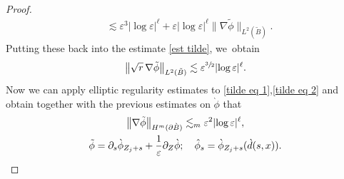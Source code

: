 \documentclass[JEP,XML,SOM,Unicode,published]{cedram}
\let\epsilon\varepsilon
\theoremstyle{definition}
\newcommand\bnorm[1]{\bigl\lVert #1\bigr\rVert}
\newcommand\eq{=}
\let\de\partial
\let\eps\epsilon
\begin{document}
\begin{proof}
\begin{align*}
&\lesssim \eps^3|{\log\eps}|^\ell+\eps|{\log\eps}|^\ell \bnorm{\nabla\tilde{\phi}}_{L^2(\tilde{B})}.
\end{align*}
Putting these back into the estimate \eqref{est tilde}, we~obtain
\begin{align*}
\bnorm{\sqrt{r}\,\nabla\tilde{\phi}}_{L^2(\tilde{B})}\lesssim \eps^{\sfrac{3}{2}}|{\log\eps}|^\ell.
\end{align*}
Now we can apply elliptic regularity estimates to \eqref{tilde eq 1},\eqref{tilde eq 2} and obtain together with the previous estimates on $\grave{\phi}$ that
\begin{gather*}
\bnorm{\nabla\tilde{\phi}}_{H^m(\de\grave{B})}\lesssim_m \eps^2|{\log\eps}|^\ell,\\
\tilde{\phi}\eq\de_s\grave{\phi}_{Z_j+s}+\frac{1}{\eps}\de_Z\grave{\phi}; \quad \hat{\phi}_s\eq\grave{\phi}_{Z_j+s}(\grave{d}(s,x)).\qedhere
\end{gather*}
\end{proof}

\label{subsec3.3}
\end{document}

